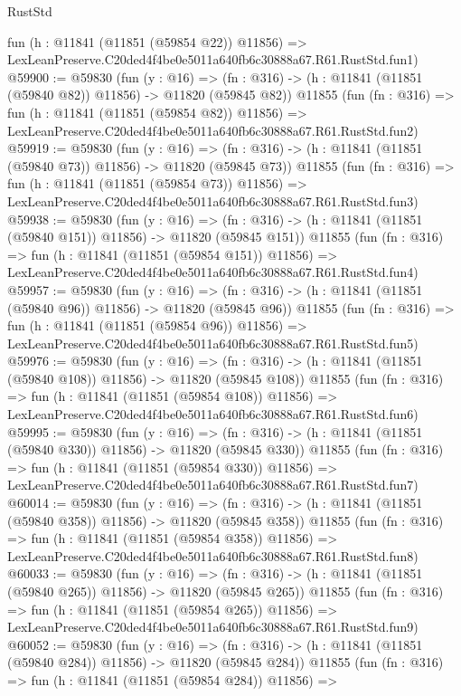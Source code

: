 \begin{lexlean}{RustStd}
\begin{coremodule}
    fun (h : @11841 (@11851 (@59854 @22)) @11856) =>
    LexLeanPreserve.C20ded4f4be0e5011a640fb6c30888a67.R61.RustStd.fun1)
@59900 := @59830
    (fun (y : @16) =>
    (fn : @316) -> (h : @11841 (@11851 (@59840 @82)) @11856) -> @11820 (@59845 @82))
    @11855
    (fun (fn : @316) =>
    fun (h : @11841 (@11851 (@59854 @82)) @11856) =>
    LexLeanPreserve.C20ded4f4be0e5011a640fb6c30888a67.R61.RustStd.fun2)
@59919 := @59830
    (fun (y : @16) =>
    (fn : @316) -> (h : @11841 (@11851 (@59840 @73)) @11856) -> @11820 (@59845 @73))
    @11855
    (fun (fn : @316) =>
    fun (h : @11841 (@11851 (@59854 @73)) @11856) =>
    LexLeanPreserve.C20ded4f4be0e5011a640fb6c30888a67.R61.RustStd.fun3)
@59938 := @59830
    (fun (y : @16) =>
    (fn : @316) -> (h : @11841 (@11851 (@59840 @151)) @11856) -> @11820 (@59845 @151))
    @11855
    (fun (fn : @316) =>
    fun (h : @11841 (@11851 (@59854 @151)) @11856) =>
    LexLeanPreserve.C20ded4f4be0e5011a640fb6c30888a67.R61.RustStd.fun4)
@59957 := @59830
    (fun (y : @16) =>
    (fn : @316) -> (h : @11841 (@11851 (@59840 @96)) @11856) -> @11820 (@59845 @96))
    @11855
    (fun (fn : @316) =>
    fun (h : @11841 (@11851 (@59854 @96)) @11856) =>
    LexLeanPreserve.C20ded4f4be0e5011a640fb6c30888a67.R61.RustStd.fun5)
@59976 := @59830
    (fun (y : @16) =>
    (fn : @316) -> (h : @11841 (@11851 (@59840 @108)) @11856) -> @11820 (@59845 @108))
    @11855
    (fun (fn : @316) =>
    fun (h : @11841 (@11851 (@59854 @108)) @11856) =>
    LexLeanPreserve.C20ded4f4be0e5011a640fb6c30888a67.R61.RustStd.fun6)
@59995 := @59830
    (fun (y : @16) =>
    (fn : @316) -> (h : @11841 (@11851 (@59840 @330)) @11856) -> @11820 (@59845 @330))
    @11855
    (fun (fn : @316) =>
    fun (h : @11841 (@11851 (@59854 @330)) @11856) =>
    LexLeanPreserve.C20ded4f4be0e5011a640fb6c30888a67.R61.RustStd.fun7)
@60014 := @59830
    (fun (y : @16) =>
    (fn : @316) -> (h : @11841 (@11851 (@59840 @358)) @11856) -> @11820 (@59845 @358))
    @11855
    (fun (fn : @316) =>
    fun (h : @11841 (@11851 (@59854 @358)) @11856) =>
    LexLeanPreserve.C20ded4f4be0e5011a640fb6c30888a67.R61.RustStd.fun8)
@60033 := @59830
    (fun (y : @16) =>
    (fn : @316) -> (h : @11841 (@11851 (@59840 @265)) @11856) -> @11820 (@59845 @265))
    @11855
    (fun (fn : @316) =>
    fun (h : @11841 (@11851 (@59854 @265)) @11856) =>
    LexLeanPreserve.C20ded4f4be0e5011a640fb6c30888a67.R61.RustStd.fun9)
@60052 := @59830
    (fun (y : @16) =>
    (fn : @316) -> (h : @11841 (@11851 (@59840 @284)) @11856) -> @11820 (@59845 @284))
    @11855
    (fun (fn : @316) =>
    fun (h : @11841 (@11851 (@59854 @284)) @11856) =>

\end{coremodule}
\end{lexlean}
